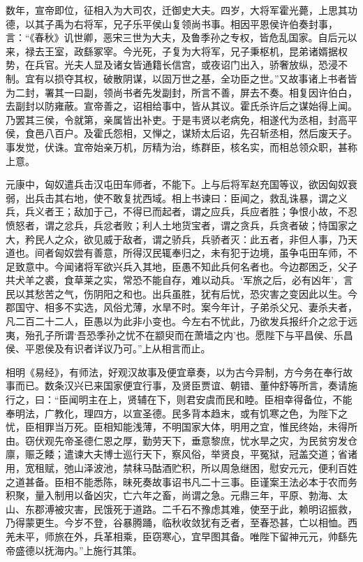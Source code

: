 \documentclass[12pt,UTF8]{ctexbook}
\begin{document}
数年，宣帝即位，征相入为大司农，迁御史大夫。四岁，大将军霍光薨，上思其功德，以其子禹为右将军，兄子乐平侯山复领尚书事。相因平恩侯许伯奏封事，言：“《春秋》讥世卿，恶宋三世为大夫，及鲁季孙之专权，皆危乱国家。自后元以来，禄去王室，政繇冢宰。今光死，子复为大将军，兄子秉枢机，昆弟诸婿据权势，在兵官。光夫人显及诸女皆通籍长信宫，或夜诏门出入，骄奢放纵，恐浸不制。宜有以损夺其权，破散阴谋，以固万世之基，全功臣之世。”又故事诸上书者皆为二封，署其一曰副，领尚书者先发副封，所言不善，屏去不奏。相复因许伯白，去副封以防雍蔽。宣帝善之，诏相给事中，皆从其议。霍氏杀许后之谋始得上闻。乃罢其三侯，令就第，亲属皆出补吏。于是韦贤以老病免，相遂代为丞相，封高平侯，食邑八百户。及霍氏怨相，又惮之，谋矫太后诏，先召斩丞相，然后废天子。事发觉，伏诛。宜帝始亲万机，厉精为治，练群臣，核名实，而相总领众职，甚称上意。



元康中，匈奴遣兵击汉屯田车师者，不能下。上与后将军赵充国等议，欲因匈奴衰弱，出兵击其右地，使不敢复扰西域。相上书谏曰：臣闻之，救乱诛暴，谓之义兵，兵义者王；敌加于己，不得已而起者，谓之应兵，兵应者胜；争恨小故，不忍愤怒者，谓之忿兵，兵忿者败；利人土地货宝者，谓之贪兵，兵贪者破；恃国家之大，矜民人之众，欲见威于敌者，谓之骄兵，兵骄者灭：此五者，非但人事，乃天道也。间者匈奴尝有善意，所得汉民辄奉归之，未有犯于边境，虽争屯田车师，不足致意中。今闻诸将军欲兴兵入其地，臣愚不知此兵何名者也。今边郡困乏，父子共犬羊之裘，食草莱之实，常恐不能自存，难以动兵。‘军旅之后，必有凶年’，言民以其愁苦之气，伤阴阳之和也。出兵虽胜，犹有后忧，恐灾害之变因此以生。今郡国守、相多不实选，风俗尤薄，水旱不时。案今年计，子弟杀父兄、妻杀夫者，凡二百二十二人，臣愚以为此非小变也。今左右不忧此，乃欲发兵报纤介之忿于远夷，殆孔子所谓‘吾恐季孙之忧不在颛臾而在萧墙之内’也。愿陛下与平昌侯、乐昌侯、平恩侯及有识者详议乃可。”上从相言而止。



相明《易经》，有师法，好观汉故事及便宜章奏，以为古今异制，方今务在奉行故事而已。数条汉兴已来国家便宜行事，及贤臣贾谊、朝错、董仲舒等所言，奏请施行之，曰：“臣闻明主在上，贤辅在下，则君安虞而民和睦。臣相幸得备位，不能奉明法，广教化，理四方，以宣圣德。民多背本趋末，或有饥寒之色，为陛下之忧，臣相罪当万死。臣相知能浅薄，不明国家大体，明用之宜，惟民终始，未得所由。窃伏观先帝圣德仁恩之厚，勤劳天下，垂意黎庶，忧水旱之灾，为民贫穷发仓廪，赈乏餧；遣谏大夫博士巡行天下，察风俗，举贤良，平冤狱，冠盖交道；省诸用，宽租赋，弛山泽波池，禁秣马酤酒贮积，所以周急继困，慰安元元，便利百姓之道甚备。臣相不能悉陈，昧死奏故事诏书凡二十三事。臣谨案王法必本于农而务积聚，量入制用以备凶灾，亡六年之畜，尚谓之急。元鼎三年，平原、勃海、太山、东郡溥被灾害，民饿死于道路。二千石不豫虑其难，使至于此，赖明诏振救，乃得蒙更生。今岁不登，谷暴腾踊，临秋收敛犹有乏者，至春恐甚，亡以相恤。西羌未平，师旅在外，兵革相乘，臣窃寒心，宜早图其备。唯陛下留神元元，帅繇先帝盛德以抚海内。”上施行其策。
\end{document}
